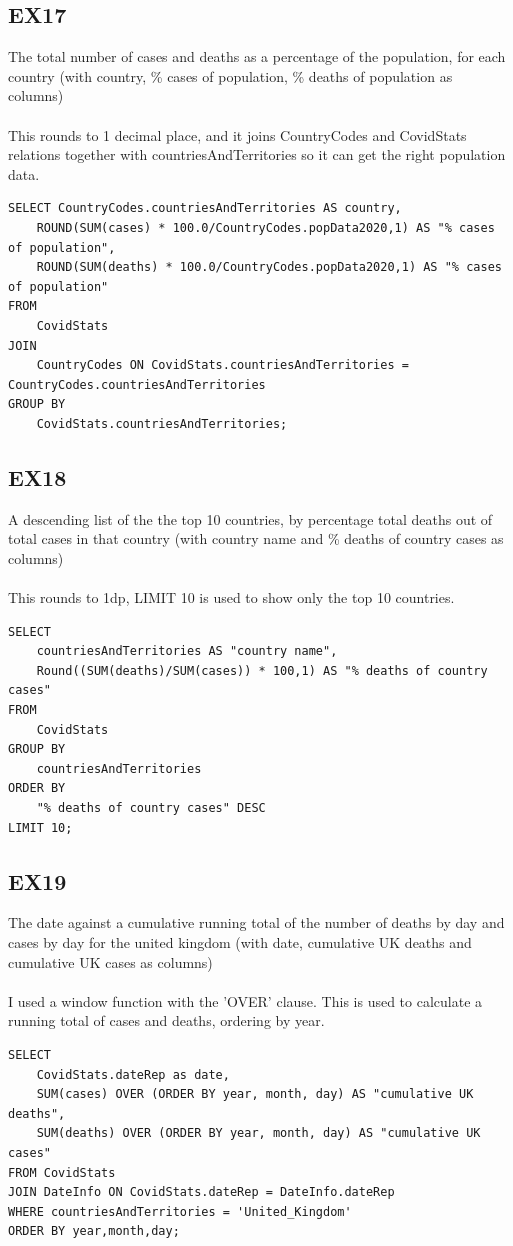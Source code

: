 \documentclass[]{article}
\begin{document}
\subsection{EX17}
The total number of cases and deaths as a percentage of the population, for each country (with country, \% cases of population, \% deaths of population as columns)\\
\\This rounds to 1 decimal place, and it joins CountryCodes and CovidStats relations together with countriesAndTerritories so it can get the right population data.
\begin{verbatim}
SELECT CountryCodes.countriesAndTerritories AS country,
    ROUND(SUM(cases) * 100.0/CountryCodes.popData2020,1) AS "% cases of population",
    ROUND(SUM(deaths) * 100.0/CountryCodes.popData2020,1) AS "% cases of population"
FROM
    CovidStats
JOIN
    CountryCodes ON CovidStats.countriesAndTerritories = CountryCodes.countriesAndTerritories
GROUP BY
    CovidStats.countriesAndTerritories;
\end{verbatim}

\subsection{EX18}
A descending list of the the top 10 countries, by percentage total deaths out of total cases in that country (with country name and \% deaths of country cases as columns)\\
\\This rounds to 1dp, LIMIT 10 is used to show only the top 10 countries.
\begin{verbatim}
SELECT
    countriesAndTerritories AS "country name",
    Round((SUM(deaths)/SUM(cases)) * 100,1) AS "% deaths of country cases"
FROM
    CovidStats
GROUP BY
    countriesAndTerritories
ORDER BY
    "% deaths of country cases" DESC
LIMIT 10;
\end{verbatim}

\subsection{EX19}
The date against a cumulative running total of the number of deaths by day and cases by day for the united kingdom (with date, cumulative UK deaths and cumulative UK cases as columns)\\
\\I used a window function with the 'OVER' clause. This is used to calculate a running total of cases and deaths, ordering by year.
\begin{verbatim}
SELECT
    CovidStats.dateRep as date,
    SUM(cases) OVER (ORDER BY year, month, day) AS "cumulative UK deaths",
    SUM(deaths) OVER (ORDER BY year, month, day) AS "cumulative UK cases"
FROM CovidStats
JOIN DateInfo ON CovidStats.dateRep = DateInfo.dateRep
WHERE countriesAndTerritories = 'United_Kingdom'
ORDER BY year,month,day;

\end{verbatim}
\end{document}
